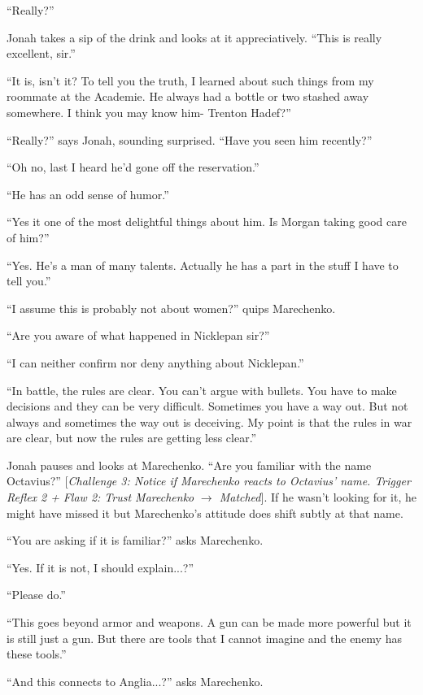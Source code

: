 ``Really?''

Jonah takes a sip of the drink and looks at it appreciatively.  ``This is really excellent, sir.''

``It is, isn't it?  To tell you the truth, I learned about such things from my roommate at the Academie.  He always had a bottle or two stashed away somewhere.  I think you may know him- Trenton Hadef?''

``Really?'' says Jonah, sounding surprised.  ``Have you seen him recently?''

``Oh no, last I heard he'd gone off the reservation.''

``He has an odd sense of humor.''

``Yes it one of the most delightful things about him.  Is Morgan taking good care of him?''

``Yes.  He's a man of many talents. Actually he has a part in the stuff I have to tell you.''

``I assume this is probably not about women?'' quips Marechenko.

``Are you aware of what happened in Nicklepan sir?''

``I can neither confirm nor deny anything about Nicklepan.''

``In battle, the rules are clear.  You can't argue with bullets.  You have to make decisions and they can be very difficult.  Sometimes you have a way out.  But not always and sometimes the way out is deceiving.  My point is that the rules in war are clear, but now the rules are getting less clear.''

Jonah pauses and looks at Marechenko.  ``Are you familiar with the name Octavius?''  {[}\textit{Challenge 3: Notice if Marechenko reacts to Octavius' name.  Trigger Reflex 2 + }\textit{ {\color[RGB]{255,0,0}Flaw 2: Trust Marechenko} }\textit{ $\rightarrow$ Matched}{]}.  If he wasn't looking for it, he might have missed it but Marechenko's attitude does shift subtly at that name.

``You are asking if it is familiar?'' asks Marechenko.

``Yes.  If it is not, I should explain...?''

``Please do.''

``This goes beyond armor and weapons.  A gun can be made more powerful but it is still just a gun.  But there are tools that I cannot imagine and the enemy has these tools.''

``And this connects to Anglia...?'' asks Marechenko.

